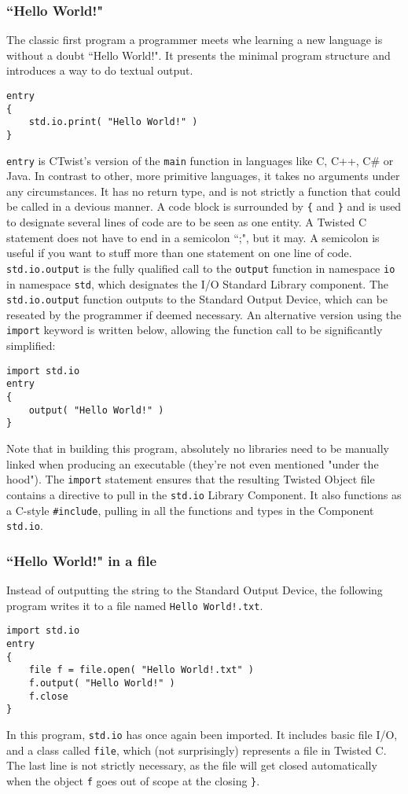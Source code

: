 \documentclass[a4paper,11pt]{article}
\newcommand{\tcode}[1]{\texttt{#1}}
\begin{document}
    \subsubsection{``Hello World!"}

The classic first program a programmer meets whe learning a new language is without a doubt ``Hello World!".
It presents the minimal program structure and introduces a way to do textual output.
\begin{lstlisting}
entry
{
    std.io.print( "Hello World!" )
}
\end{lstlisting}
\lstinline|entry| is CTwist's version of the \lstinline|main| function in languages like C, C++, C\# or Java.
In contrast to other, more primitive languages, it takes no arguments under any circumstances.
It has no return type, and is not strictly a function that could be called in a devious manner.
A code block is surrounded by \tcode{\{} and \tcode{\}} and is used to designate several lines of code are to be seen as one entity.
A Twisted C statement does not have to end in a semicolon ``;", but it may.
A semicolon is useful if you want to stuff more than one statement on one line of code.
\tcode{std.io.output} is the fully qualified call to the \tcode{output} function in namespace \tcode{io} in namespace \tcode{std}, which designates the I/O Standard Library component.
The \tcode{std.io.output} function outputs to the Standard Output Device, which can be reseated by the programmer if deemed necessary.
An alternative version using the \tcode{import} keyword is written below, allowing the function call to be significantly simplified:
\begin{lstlisting}
import std.io
entry
{
    output( "Hello World!" )
}
\end{lstlisting}
Note that in building this program, absolutely no libraries need to be manually linked when producing an executable (they're not even mentioned "under the hood").
The \tcode{import} statement ensures that the resulting Twisted Object file contains a directive to pull in the \tcode{std.io} Library Component.
It also functions as a C-style \tcode{\#include}, pulling in all the functions and types in the Component \tcode{std.io}.

    \subsubsection{``Hello World!" in a file}

Instead of outputting the string to the Standard Output Device, the following program writes it to a file named \tcode{Hello World!.txt}.
\begin{lstlisting}
import std.io
entry
{
    file f = file.open( "Hello World!.txt" )
    f.output( "Hello World!" )
    f.close
}
\end{lstlisting}
In this program, \tcode{std.io} has once again been imported.
It includes basic file I/O, and a class called \tcode{file}, which (not surprisingly) represents a file in Twisted C.
The last line is not strictly necessary, as the file will get closed automatically when the object \tcode{f} goes out of scope at the closing \tcode{\}}.
\end{document}
